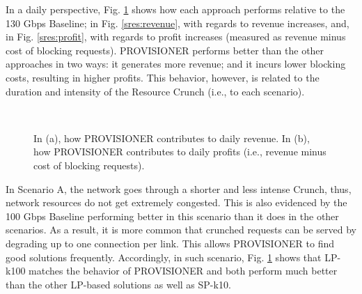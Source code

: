 \documentclass[journal]{IEEEtran}
\begin{document}
In a daily perspective, Fig. \ref{res:revenue_profit} shows how each approach performs relative to the 130 Gbps Baseline; in Fig. \ref{sres:revenue}, with regards to revenue increases, and, in Fig. \ref{sres:profit}, with regards to profit increases (measured as revenue minus cost of blocking requests). PROVISIONER performs better than the other approaches in two ways: it generates more revenue; and it incurs lower blocking costs, resulting in higher profits. This behavior, however, is related to the duration and intensity of the Resource Crunch (i.e., to each scenario). %




\begin{figure}[!t]
\centering
 \\
 \hspace{-0.5cm}
 \centering
 \caption{In (a), how PROVISIONER contributes to daily revenue. In (b), how PROVISIONER contributes to daily profits (i.e., revenue minus cost of blocking requests).}
 \label{res:revenue_profit} 
\end{figure}

In Scenario A, the network goes through a shorter and less intense Crunch, thus, network resources do not get extremely congested. This is also evidenced by the 100 Gbps Baseline performing better in this scenario than it does in the other scenarios. As a result, it is more common that crunched requests can be served by degrading up to one connection per link. This allows PROVISIONER to find good solutions frequently. Accordingly, in such scenario, Fig. \ref{res:revenue_profit} shows that LP-k100 matches the behavior of PROVISIONER and both perform much better than the other LP-based solutions as well as SP-k10.
\end{document}

